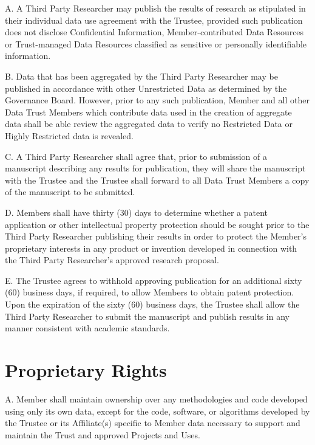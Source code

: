 \documentclass[]{book}
\begin{document}
A. A Third Party Researcher may publish the results of research as stipulated in their individual data use agreement with the Trustee, provided such publication does not disclose Confidential Information, Member-contributed Data Resources or Trust-managed Data Resources classified as sensitive or personally identifiable information.

B. Data that has been aggregated by the Third Party Researcher may be published in accordance with other Unrestricted Data as determined by the Governance Board. However, prior to any such publication, Member and all other Data Trust Members which contribute data used in the creation of aggregate data shall be able review the aggregated data to verify no Restricted Data or Highly Restricted data is revealed.

C. A Third Party Researcher shall agree that, prior to submission of a manuscript describing any results for publication, they will share the manuscript with the Trustee and the Trustee shall forward to all Data Trust Members a copy of the manuscript to be submitted.

D. Members shall have thirty (30) days to determine whether a patent application or other intellectual property protection should be sought prior to the Third Party Researcher publishing their results in order to protect the Member's proprietary interests in any product or invention developed in connection with the Third Party Researcher's approved research proposal.

E. The Trustee agrees to withhold approving publication for an additional sixty (60) business days, if required, to allow Members to obtain patent protection. Upon the expiration of the sixty (60) business days, the Trustee shall allow the Third Party Researcher to submit the manuscript and publish results in any manner consistent with academic standards.

\hypertarget{proprietary-rights}{%
\chapter{Proprietary Rights}\label{proprietary-rights}}

A. Member shall maintain ownership over any methodologies and code developed using only its own data, except for the code, software, or algorithms developed by the Trustee or its Affiliate(s) specific to Member data necessary to support and maintain the Trust and approved Projects and Uses.
\end{document}
